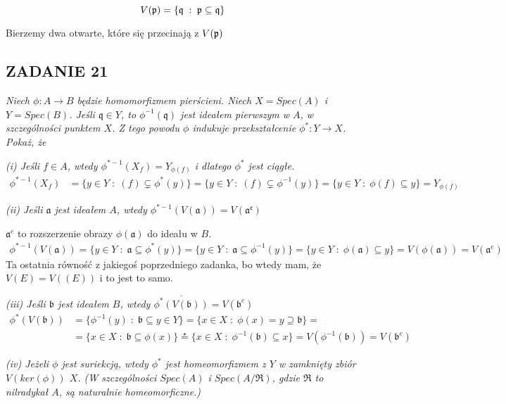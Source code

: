\documentclass{article}
\begin{document}
$$V(\mathfrak{p})=\{\mathfrak{q}\;:\;\mathfrak{p}\subseteq\mathfrak{q}\}$$

Bierzemy dwa otwarte, które się przecinają z $V(\mathfrak{p})$

\subsection*{ZADANIE 21}
\emph{\color{pink}Niech $\phi:A\to B$ będzie homomorfizmem pierścieni. Niech $X=Spec(A)$ i $Y=Spec(B)$. Jeśli $\mathfrak{q}\in Y$, to $\phi^{-1}(\mathfrak{q})$ jest ideałem pierwszym w $A$, w szczególności punktem $X$. Z tego powodu $\phi$ indukuje przekształcenie $\phi^*:Y\to X$. Pokaż, że}

\emph{\color{pink}(i) Jeśli $f\in A$, wtedy $\phi^{*-1}(X_f)=Y_{\phi(f)}$ i dlatego $\phi^*$ jest ciągłe.}
\begin{align*}
    \phi^{*-1}(X_f)&=\{y\in Y\;:\;(f)\subsetneq\phi^*(y)\}=\{y\in Y\;:\;(f)\subsetneq\phi^{-1}(y)\}=\{y\in Y\;:\;\phi(f)\subseteq y\}=Y_{\phi(f)}
\end{align*}

\emph{\color{pink}(ii) Jeśli $\mathfrak{a}$ jest ideałem $A$, wtedy $\phi^{*-1}(V(\mathfrak{a}))=V(\mathfrak{a^e})$ }

$\mathfrak{a}^e$ to rozszerzenie obrazy $\phi(\mathfrak{a})$ do ideału w $B$.
\begin{align*}
    \phi^{*-1}(V(\mathfrak{a}))=\{y\in Y\;:\;\mathfrak{a}\subseteq \phi^*(y)\}=\{y\in Y\;:\;\mathfrak{a}\subseteq\phi^{-1}(y)\}=\{y\in Y\;:\;\phi(\mathfrak{a})\subseteq y\}=V(\phi(\mathfrak{a}))=V(\mathfrak{a}^e)
\end{align*}
Ta ostatnia równość z jakiegoś poprzedniego zadanka, bo wtedy mam, że $V(E)=V((E))$ i to jest to samo.

\emph{\color{pink}(iii) Jeśli $\mathfrak{b}$ jest ideałem $B$, wtedy $\overline{\phi^*(V(\mathfrak{b}))}=V(\mathfrak{b}^c)$}
\begin{align*}
    \phi^*(V(\mathfrak{b}))&=\{\phi^{-1}(y)\;:\;\mathfrak{b}\subseteq y\in Y\}=\{x\in X\;:\;\phi(x)=y\supseteq \mathfrak{b}\}=\\
    &=\{x\in X\;:\;\mathfrak{b}\subseteq\phi(x)\}\overset{\star}{=}\{x\in X\;:\;\phi^{-1}(\mathfrak{b})\subseteq x\}=V(\phi^{-1}(\mathfrak{b}))=V(\mathfrak{b}^c)
\end{align*}

\emph{\color{yellow}(iv) Jeżeli $\phi$ jest suriekcją, wtedy $\phi^*$ jest homeomorfizmem z $Y$ w zamknięty zbiór $V(ker(\phi))$ $X$. (W szczególności $Spec(A)$ i $Spec(A/\mathfrak{R})$, gdzie $\mathfrak{R}$ to nilradykał $A$, są naturalnie homeomorficzne.)}
\end{document}
